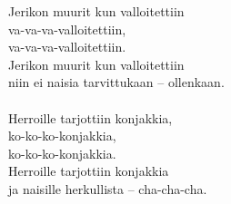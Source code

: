 
            Jerikon muurit kun valloitettiin \\
            va-va-va-valloitettiin, \\
            va-va-va-valloitettiin. \\
            Jerikon muurit kun valloitettiin \\
            niin ei naisia tarvittukaan – ollenkaan. \\
\hspace{10mm} \\
            Herroille tarjottiin konjakkia, \\
            ko-ko-ko-konjakkia, \\
            ko-ko-ko-konjakkia. \\
            Herroille tarjottiin konjakkia \\
            ja naisille herkullista – cha-cha-cha. \\
